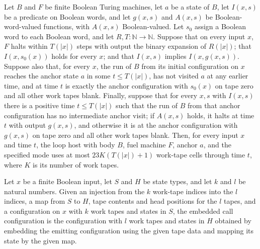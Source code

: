 \begin{theorem}
\label{Turing.FinTM.loopHostTM_spaceUsed_le_budget}
\leanok
{}
Let $B$ and $F$ be finite Boolean Turing machines, let $a$ be a state of $B$, let
$I(x,s)$ be a predicate on Boolean words, and let $g(x,s)$ and $A(x,s)$ be
Boolean-word-valued functions, with $A(x,s)$ Boolean-valued. Let $s_0$ assign a Boolean
word to each Boolean word, and let $R,T:\mathbb N\to\mathbb N$. Suppose that on every
input $x$, $F$ halts within $T(|x|)$ steps with output the binary expansion of $R(|x|)$;
that $I(x,s_0(x))$ holds for every $x$; and that $I(x,s)$ implies $I(x,g(x,s))$. Suppose
also that, for every $x$, the run of $B$ from its initial configuration on $x$ reaches
the anchor state $a$ in some $t\le T(|x|)$, has not visited $a$ at any earlier time, and
at time $t$ is exactly the anchor configuration with $s_0(x)$ on tape zero and all other
work tapes blank. Finally, suppose that for every $x,s$ with $I(x,s)$ there is a
positive time $t\le T(|x|)$ such that the run of $B$ from that anchor configuration has
no intermediate anchor visit; if $A(x,s)$ holds, it halts at time $t$ with output
$g(x,s)$, and otherwise it is at the anchor configuration with $g(x,s)$ on tape zero and
all other work tapes blank. Then, for every input $x$ and time $t$, the loop host with
body $B$, fuel machine $F$, anchor $a$, and the specified mode uses at most
$23K(T(|x|)+1)$ work-tape cells through time $t$, where $K$ is its number of work tapes.
\end{theorem}

\begin{definition}
\label{Turing.FinTM.emCallEmbeddedCfg}
\leanok
{}
Let $x$ be a finite Boolean input, let $S$ and $H$ be state types, and let $k$ and $l$
be natural numbers. Given an injection from the $k$ work-tape indices into the $l$
indices, a map from $S$ to $H$, tape contents and head positions for the $l$ tapes, and
a configuration on $x$ with $k$ work tapes and states in $S$, the embedded call
configuration is the configuration with $l$ work tapes and states in $H$ obtained by
embedding the emitting configuration using the given tape data and mapping its state by
the given map.
\end{definition}

